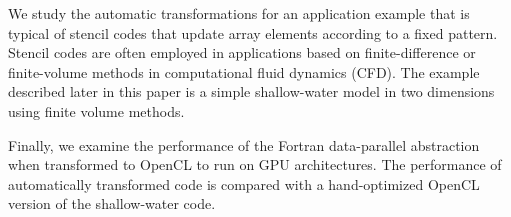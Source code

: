We study the automatic transformations for an application example that is
typical of stencil codes that update array elements according to a fixed
pattern.  Stencil codes are often employed in applications based on
finite-difference or finite-volume methods in computational fluid dynamics
(CFD).  The example described later in this paper is a simple shallow-water
model in two dimensions using finite volume methods.

Finally, we examine the performance of the Fortran data-parallel abstraction
when transformed to OpenCL to run on GPU architectures.  The performance of
automatically transformed code is compared with a hand-optimized OpenCL
version of the shallow-water code.
